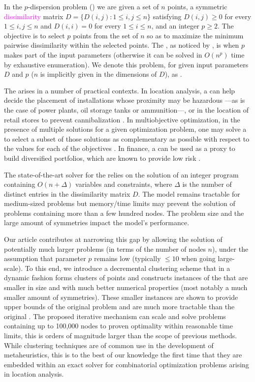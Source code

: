 \documentclass[ijoo,nonblindrev]{informs-ijoo}
\begin{document}
In the $p$-dispersion problem (\pDP{}) we are given a set of $n$ points, a symmetric \textcolor{magenta}{dissimilarity} matrix $D = \{D(i, j): 1\leq i, j\leq n\}$ satisfying $D(i, j) \geq 0$ for every $1\leq i, j\leq n$ and $D(i, i) = 0$ for every $1\leq i\leq n$, and an integer $p\geq 2$. The objective is to select $p$ points from the set of $n$ so as to maximize the minimum pairwise dissimilarity within the selected points. The \pDP{}, as noticed by \citet{Erkut1990discrete}, is \nphard{} when $p$ makes part of the input parameters (otherwise it can be solved in $O(n^p)$ time by exhaustive enumeration). We denote this problem, for given input parameters $D$ and $p$ ($n$ is implicitly given in the dimensions of $D$), as .%

The \pDP{} arises in a number of practical contexts. In location analysis, a \pDP{} can help decide the placement of installations whose proximity may be hazardous ---as is the case of power plants, oil storage tanks or ammunition---, or in the location of retail stores to prevent cannibalization \citep{Kuby1987Programming}. In multiobjective optimization, in the presence of multiple solutions for a given optimization problem, one may solve a \pDP{} to select a subset of those solutions as complementary as possible with respect to the values for each of the objectives \citep{Saboonchi2014MaxMinMin}. In finance, a \pDP{} can be used as a proxy to build diversified portfolios, which are known to provide low risk \citep{Statman1987how}.
	
The state-of-the-art solver for the \pDP{} \citep{Sayah2017new} relies on the solution of an integer program containing $O(n + \Delta)$ variables and constraints, where $\Delta$ is the number of distinct entries in the dissimilarity matrix $D$. The model remains tractable for medium-sized problems but memory/time limits may prevent the solution of problems containing more than a few hundred nodes. The problem size and the large amount of symmetries impact the model's performance. 

Our article contributes at narrowing this gap by allowing the solution of potentially much larger problems (in terms of the number of nodes $n$), under the assumption that parameter $p$ remains low (typically $\leq 10$ when going large-scale). To this end, we introduce a decremental clustering scheme that in a dynamic fashion forms clusters of points and constructs instances of the \pDP{} that are smaller in size and with much better numerical properties (most notably a much smaller amount of symmetries). These smaller instances are shown to provide upper bounds of the original problem and are much more tractable than the original \pDP{}. The proposed iterative mechanism can scale and solve problems containing up to 100,000 nodes to proven optimality within reasonable time limits, this is orders of magnitude larger than the scope of previous methods. While clustering techniques are of common use in the development of metaheuristics, this is to the best of our knowledge the first time that they are embedded within an exact solver for combinatorial optimization problems arising in location analysis.
\end{document}
